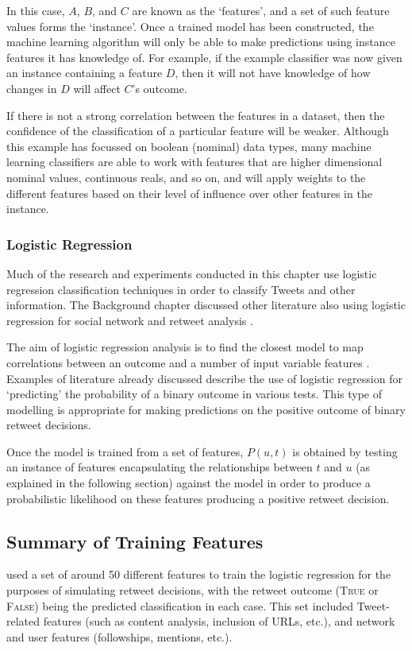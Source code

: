 In this case, $A$, $B$, and $C$ are known as the `features', and a set of such feature values forms the `instance'. Once a trained model has been constructed, the machine learning algorithm will only be able to make predictions using instance features it has knowledge of. For example, if the example classifier was now given an instance containing a feature $D$, then it will not have knowledge of how changes in $D$ will affect $C$'s outcome.

If there is not a strong correlation between the features in a dataset, then the confidence of the classification of a particular feature will be weaker. Although this example has focussed on boolean (nominal) data types, many machine learning classifiers are able to work with features that are higher dimensional nominal values, continuous reals, and so on, and will apply weights to the different features based on their level of influence over other features in the instance.


\subsubsection{Logistic Regression}
\label{section:logistic_regression}
Much of the research and experiments conducted in this chapter use logistic regression classification techniques in order to classify Tweets and other information. The Background chapter discussed other literature also using logistic regression for social network and retweet analysis \cite{castillo11, zhu11, peng11, naveed11, hong11}.

The aim of logistic regression analysis is to find the closest model to map correlations between an outcome and a number of input variable features \cite{hosmer13}. Examples of literature already discussed describe the use of logistic regression for `predicting' the probability of a binary outcome in various tests. This type of modelling is appropriate for making predictions on the positive outcome of binary retweet decisions.

Once the model is trained from a set of features, $P(u,t)$ is obtained by testing an instance of features encapsulating the relationships between $t$ and $u$ (as explained in the following section) against the model in order to produce a probabilistic likelihood on these features producing a positive retweet decision. 


\subsection{Summary of Training Features}
\citet{zhu11} used a set of around 50 different features to train the logistic regression for the purposes of simulating retweet decisions, with the retweet outcome (\textsc{True} or \textsc{False}) being the predicted classification in each case. This set included Tweet-related features (such as content analysis, inclusion of URLs, etc.), and network and user features (followships, mentions, etc.).

